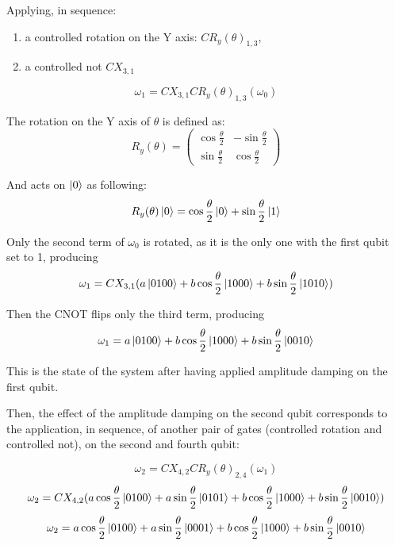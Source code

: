 \documentclass{masterthesis}
\begin{document}
Applying, in sequence:
\begin{enumerate}
    \item a controlled rotation on the Y axis: $CR_{y}(\theta)_{1,3}$,
    \item a controlled not $CX_{3,1}$
\end{enumerate}

\begin{equation}
    \omega_1 = CX_{3,1} CR_{y}(\theta)_{1,3} (\omega_0)
\end{equation}

The rotation on the Y axis of $\theta$ is defined as:
\begin{equation}
    R_y(\theta) = \begin{pmatrix} \cos\frac{\theta}{2} & -\sin\frac{\theta}{2} \\ \sin\frac{\theta}{2} & \cos\frac{\theta}{2} \end{pmatrix}
\end{equation}

And acts on $\ket{0}$ as following:
\begin{equation}
    R_y(\theta)\ket{0} = \cos\frac{\theta}{2}\ket{0} + \sin\frac{\theta}{2}\ket{1}
\end{equation}

Only the second term of $\omega_0$ is rotated, as it is the only one with the first qubit set to 1, producing
\begin{equation}
    \omega_1 = CX_{3,1} (a\ket{0100} + b\cos\frac{\theta}{2}\ket{1000} + b\sin\frac{\theta}{2}\ket{1010})
\end{equation}

Then the CNOT flips only the third term, producing
\begin{equation}
    \omega_1 = a\ket{0100} + b\cos\frac{\theta}{2}\ket{1000} + b\sin\frac{\theta}{2}\ket{0010}
\end{equation}

This is the state of the system after having applied amplitude damping on the first qubit.

Then, the effect of the amplitude damping on the second qubit corresponds to the application, in sequence, of another pair of gates (controlled rotation and controlled not), on the second and fourth qubit:

\begin{equation}
    \omega_2 = CX_{4,2} CR_{y}(\theta)_{2,4} (\omega_1)
\end{equation}
\begin{equation}
    \omega_2 = CX_{4,2} (a\cos\frac{\theta}{2}\ket{0100} + a\sin\frac{\theta}{2}\ket{0101} + b\cos\frac{\theta}{2}\ket{1000} + b\sin\frac{\theta}{2}\ket{0010})
\end{equation}
\begin{equation}
    \omega_2 = a\cos\frac{\theta}{2}\ket{0100} + a\sin\frac{\theta}{2}\ket{0001} + b\cos\frac{\theta}{2}\ket{1000} + b\sin\frac{\theta}{2}\ket{0010}
\end{equation}
\end{document}
